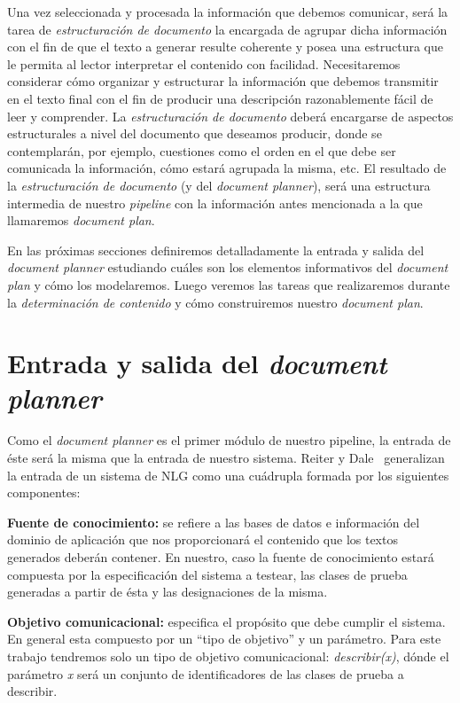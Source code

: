 Una vez seleccionada y procesada la información que debemos comunicar, será la tarea de \emph{estructuración de documento} la encargada de agrupar dicha información con el fin de que el texto a generar resulte coherente y posea una estructura que le permita al lector interpretar el contenido con facilidad. Necesitaremos considerar cómo organizar y estructurar la información que debemos transmitir en el texto final con el fin de producir una descripción razonablemente fácil de leer y comprender. La \emph{estructuración de documento} deberá encargarse de aspectos estructurales a nivel del documento que deseamos producir, donde se contemplarán, por ejemplo, cuestiones como el orden en el que debe ser comunicada la información, cómo estará agrupada la misma, etc. El resultado de la \emph{estructuración de documento} (y del \textit{document planner}), será una estructura intermedia de nuestro \textit{pipeline} con la información antes mencionada a la que llamaremos \emph{document plan}. 

En las próximas secciones definiremos detalladamente la entrada y salida del \textit{document planner} estudiando cuáles son los elementos informativos del \emph{document plan} y cómo los modelaremos. Luego veremos las tareas que realizaremos durante la \emph{determinación de contenido} y cómo construiremos nuestro \textit{document plan}. 

\section{Entrada y salida del \textit{document planner}}
Como el \textit{document planner} es el primer módulo de nuestro pipeline, la entrada de éste será la misma que la entrada de nuestro sistema. Reiter y Dale~\cite{reiter_dale} generalizan la entrada de un sistema de NLG  como una cuádrupla formada por los siguientes componentes:

\bigskip
\noindent
\textbf{Fuente de conocimiento:} se refiere a las bases de datos e información del dominio de aplicación que nos proporcionará el contenido que los textos generados deberán contener.
En nuestro, caso la fuente de conocimiento estará compuesta por la especificación del sistema a testear, las clases de prueba generadas a partir de ésta y las designaciones de la misma. 

\bigskip
\noindent
\textbf{Objetivo comunicacional:} especifica el propósito que debe cumplir el sistema. En general esta compuesto por un ``tipo de objetivo'' y un parámetro.
Para este trabajo tendremos solo un tipo de objetivo comunicacional: \emph{describir(x)}, dónde el parámetro \emph{x} será un conjunto de identificadores de las clases de prueba a describir.

